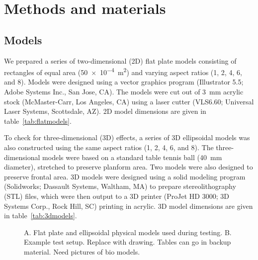 \section{Methods and materials}

\subsection{Models}

We prepared a series of two-dimensional (2D) flat plate models consisting of rectangles of equal area (\SI{50e-4}{\meter\squared}) and varying aspect ratios (1, 2, 4, 6, and 8). Models were designed using a vector graphics program (Illustrator 5.5; Adobe Systems Inc., San Jose, CA). The models were cut out of \SI{3}{\milli\meter} acrylic stock (McMaster-Carr, Los Angeles, CA) using a laser cutter (VLS6.60; Universal Laser Systems, Scottsdale, AZ).  2D model dimensions are given in table~\ref{tab:flatmodels}. 


To check for three-dimensional (3D) effects, a series of 3D ellipsoidal models was also constructed using the same aspect ratios (1, 2, 4, 6, and 8).  The three-dimensional models were based on a standard table tennis ball (\SI{40}{\milli\meter} diameter), stretched to preserve planform area.  Two models were also designed to preserve frontal area.  3D models were designed using a solid modeling program (Solidworks; Dassault Systems, Waltham, MA) to prepare stereolithography (STL) files, which were then output to a 3D printer (ProJet HD 3000; 3D Systems Corp., Rock Hill, SC) printing in acrylic. 3D model dimensions are given in table~\ref{tab:3dmodels}.

\begin{figure}
\caption{A. Flat plate and ellipsoidal physical models used during testing. B. Example test setup.  Replace with drawing. Tables can go in backup material.  Need pictures of bio models.}
\end{figure}

